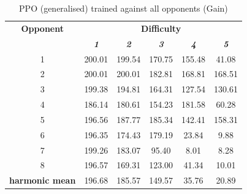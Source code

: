 \documentclass[conference]{IEEEtran}
\begin{document}
    \begin{table}[htbp]
        \caption{PPO (generalised) trained against all opponents (Gain)}
        \begin{center}
            \begin{tabular}{|c|c|c|c|c|c|}
                \hline
                \textbf{Opponent}&\multicolumn{5}{|c|}{\textbf{Difficulty}} \\
                \cline{2-6}
                & \textbf{\textit{1}}& \textbf{\textit{2}}& \textbf{\textit{3}} & \textbf{\textit{4}} & \textbf{\textit{5}} \\
                \hline
                 1 &  200.01 &  199.54 &  170.75 &  155.48 &   41.08\\
                 2 &  200.01 &  200.01 &  182.81 &  168.81 &  168.51\\
                 3 &  199.38 &  194.81 &  164.31 &  127.54 &  130.61\\
                 4 &  186.14 &  180.61 &  154.23 &  181.58 &   60.28\\
                 5 &  196.56 &  187.77 &  185.34 &  142.41 &  158.31\\
                 6 &  196.35 &  174.43 &  179.19 &   23.84 &    9.88\\
                 7 &  199.26 &  183.07 &   95.40 &    8.01 &    8.28\\
                 8 &  196.57 &  169.31 &  123.00 &   41.34 &   10.01\\
                \hline
                \textbf{harmonic mean} & 196.68 & 185.57 & 149.57 & 35.76 & 20.89 \\
                \hline
            \end{tabular}
            \label{PPO against all opponents gain}
        \end{center}
    \end{table}
\end{document}
